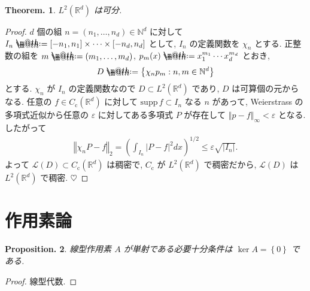 \documentclass[openany, a4paper, oneside]{book}
\makeatletter
\newcommand*{\defeq}{\mathrel{\rlap{%
\raisebox{0.3ex}{$\m@th\cdot$}}%
\raisebox{-0.3ex}{$\m@th\cdot$}}%
=}
\theoremstyle{break}
\newtheorem{thm}{Theorem.}[section]
\newtheorem{prop}[thm]{Proposition.}
\theoremstyle{breakdefn}
\newcommand{\abs}[1]{\left|#1\right|}
\newcommand{\norm}[1]{\left\Vert#1\right\Vert}
\newcommand{\rbk}[1]{\left (#1\right)}
\newcommand{\cbk}[1]{\left\{#1\right\}}
\newcommand{\set}[2]{\left\{#1 : #2\right\}}
\newcommand{\bbN}{\mathbb{N}}
\newcommand{\bbRd}{\mathbb{R}^d}
\newcommand{\calL}{\mathcal{L}}
\newcommand{\supp}{\mathrm{supp} \,}
\makeatother
\begin{document}
\begin{thm}
 $L^2 (\bbRd)$ は可分.
\end{thm}
\begin{proof}
$d$ 個の組 $n = (n_{1}, \dots, n_{d}) \in \bbN^d$ に対して
$I_{n} \defeq [-n_{1}, n_{1}] \times \cdots \times[-n_{d}, n_{d}]$
として, $I_{n}$ の定義関数を $\chi_{n}$ とする.
正整数の組を $m \defeq  (m_1, \dots, m_d)$, $p_m (x) \defeq x_1^{m_1} \cdots x_d^{m_d}$ とおき,
\begin{align}
 D
 \defeq
 \set{\chi_n p_m}{n, m \in \bbN^d}
\end{align}
とする.
$\chi_{n}$ が $I_{n}$ の定義関数なので $D \subset L^2 (\bbRd)$ であり, $D$ は可算個の元からなる.
任意の $f \in C_{\mathrm{c}}(\bbRd)$ に対して $\supp f \subset I_{n}$ なる $n$ があって,
Weierstrass の多項式近似から任意の $\varepsilon$ に対してある多項式 $P$ が存在して
$\norm{p - f}_{\infty} < \varepsilon$ となる.
したがって
\begin{align}
 \norm{\chi_n P -f}_{2}
 =
 \rbk{\int_{I_n} \abs{P - f}^2 dx}^{1/2}
 \leq
 \varepsilon \sqrt{\abs{I_n}}.
\end{align}
よって $\calL (D)\subset C_{\mathrm{c}}(\bbRd)$ は稠密で,
$C_{\mathrm{c}}$ が $L^2 (\bbRd)$ で稠密だから, $\calL (D)$ は $L^2 (\bbRd)$ で稠密.
$\heartsuit$
\end{proof}
\section{作用素論}
\label{sec-7-13-6}

\begin{prop}
 線型作用素 $A$ が単射である必要十分条件は $\ker A = \cbk{0}$ である.
\end{prop}
\begin{proof}
線型代数.
\end{proof}
\end{document}
